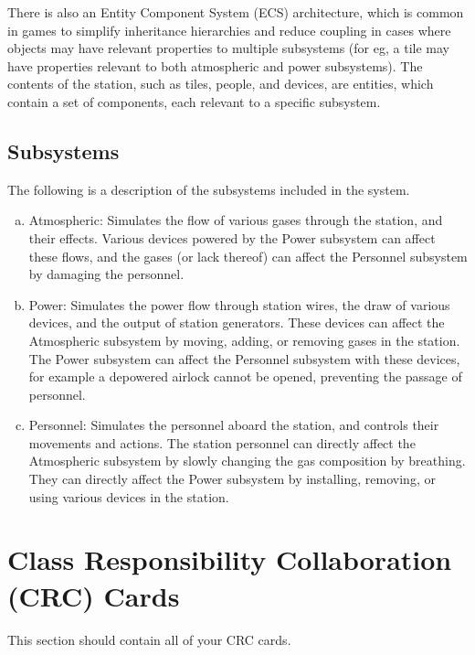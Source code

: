 \documentclass[]{article}
\begin{document}
There is also an Entity Component System (ECS) architecture, which is common in games to simplify inheritance hierarchies and reduce coupling in cases where objects may have relevant properties to multiple subsystems (for eg, a tile may have properties relevant to both atmospheric and power subsystems). The contents of the station, such as tiles, people, and devices, are entities, which contain a set of components, each relevant to a specific subsystem.

\subsection{Subsystems}
\label{sub:subsystems}
The following is a description of the subsystems included in the system.
\begin{enumerate}[a)]
	\item Atmospheric: Simulates the flow of various gases through the station, and their effects. Various devices powered by the Power subsystem can affect these flows, and the gases (or lack thereof) can affect the Personnel subsystem by damaging the personnel.
	\item Power: Simulates the power flow through station wires, the draw of various devices, and the output of station generators. These devices can affect the Atmospheric subsystem by moving, adding, or removing gases in the station. The Power subsystem can affect the Personnel subsystem with these devices, for example a depowered airlock cannot be opened, preventing the passage of personnel.
	\item Personnel: Simulates the personnel aboard the station, and controls their movements and actions. The station personnel can directly affect the Atmospheric subsystem by slowly changing the gas composition by breathing. They can directly affect the Power subsystem by installing, removing, or using various devices in the station.
\end{enumerate}

\section{Class Responsibility Collaboration (CRC) Cards}
\label{sec:class_responsibility_collaboration_crc_cards}
This section should contain all of your CRC cards.
\end{document}
